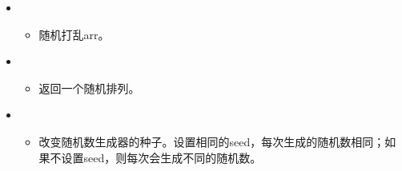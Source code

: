 \documentclass[letterpaper,10pt,english]{sphinxmanual}
\begin{document}
\begin{itemize}
\item {} 
\begin{itemize}
\item {} 
随机打乱arr。

\end{itemize}

\item {} 
\begin{itemize}
\item {} 
返回一个随机排列。

\end{itemize}

\item {} 
\begin{itemize}
\item {} 
改变随机数生成器的种子。设置相同的seed，每次生成的随机数相同；如果不设置seed，则每次会生成不同的随机数。

\end{itemize}

\end{itemize}
\end{document}
